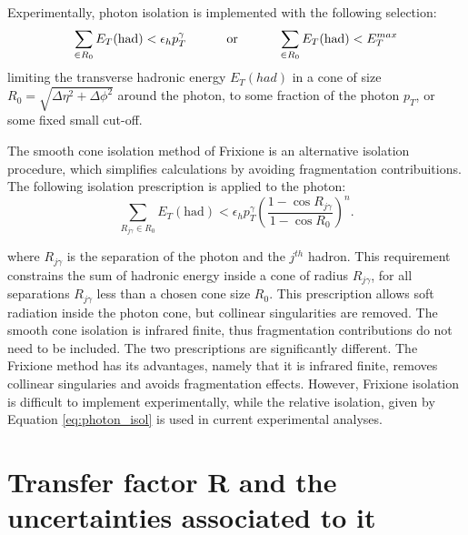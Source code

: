 \documentclass[11pt,a4paper,openright,twoside]{report}
\begin{document}
Experimentally, photon isolation is implemented with the following selection:
\begin{equation}
\sum_{\in R_0} E_T(\text{had}) < \epsilon_h p_T^\gamma \text{\hspace{1cm} or \hspace{1cm}} \sum_{\in R_0} E_T(\text{had}) < E_T^{max}
\label{eq:photon_isol}
\end{equation}
limiting the transverse hadronic energy $E_T(had)$ in a cone of size $R_0 = \sqrt{\Delta\eta^2 + \Delta\phi^2}$ around the photon, to some fraction of the photon $p_T$, or some fixed small cut-off.

The smooth cone isolation method of Frixione \cite{frixione} is an alternative isolation procedure, which simplifies calculations by avoiding fragmentation contribuitions. The following isolation prescription is applied to the photon:
\begin{equation}
	\sum_{R_{j\gamma} \in R_0} E_T(\text{had}) < \epsilon_h p_T^\gamma \left(\frac{1-\cos R_{j\gamma}}{1-\cos R_0}\right)^n.
\label{eq:frix_isol}
\end{equation}

where $R_{j\gamma}$ is the separation of the photon and the $j^{th}$ hadron. This requirement constrains the sum of hadronic energy inside a cone of radius $R_{j\gamma}$, for all separations $R_{j\gamma}$ less than a chosen cone size $R_0$. This prescription allows soft radiation inside the photon cone, but collinear singularities are removed. The smooth cone isolation is infrared finite, thus fragmentation contributions do not need to be included. The two prescriptions are significantly different. The Frixione method has its advantages, namely that it is infrared finite, removes collinear singularies and avoids fragmentation effects. However, Frixione isolation is difficult to implement experimentally, while the relative isolation, given by Equation \ref{eq:photon_isol} is used in current experimental analyses. 

\chapter{Transfer factor R and the uncertainties associated to it}\label{ch:Results}
\end{document}
